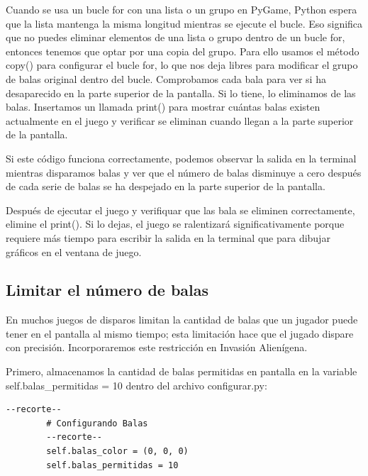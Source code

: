 Cuando se usa un bucle {\ttfamily for} con una lista o un grupo en PyGame, Python espera que la lista mantenga 
la misma longitud mientras se ejecute el bucle. Eso significa que no puedes eliminar elementos de una lista o grupo dentro de un bucle  {\ttfamily for}, entonces tenemos que optar por una copia del grupo. Para ello usamos el método {\ttfamily copy()} para configurar
 el bucle  {\ttfamily for}, lo que nos deja libres para modificar el grupo de balas original dentro del bucle. 
Comprobamos cada bala para ver si ha desaparecido en la parte superior de la pantalla. 
Si lo tiene, lo eliminamos de las balas. 
Insertamos un llamada {\ttfamily print()} para mostrar cuántas balas existen actualmente en el juego y verificar
se eliminan cuando llegan a la parte superior de la pantalla.

Si este código funciona correctamente, podemos observar la salida en la terminal mientras disparamos
balas y ver que el número de balas disminuye a cero después de cada serie de balas se ha despejado en la parte superior de la pantalla. 

Después de ejecutar el juego y verifiquar que las bala se eliminen correctamente, elimine el {\ttfamily print()}.
Si lo dejas, el juego se ralentizará significativamente porque requiere más tiempo para escribir la salida en la terminal
que para dibujar gráficos en el ventana de juego.

\subsection{Limitar el número de balas}

En muchos juegos de disparos limitan la cantidad de balas que un jugador puede tener en el
pantalla al mismo tiempo; esta limitación hace que el jugado dispare con precisión. Incorporaremos este restricción   
en Invasión Alienígena.   

Primero, almacenamos la cantidad de balas permitidas en pantalla en la variable {\ttfamily self.balas\_permitidas = 10} dentro del archivo  {\ttfamily configurar.py}:

\hspace{-2.75cm}{\ttfamily \scriptsize configurar.py}  \vspace{-0.5cm}
\begin{lstlisting}	
--recorte--	
        # Configurando Balas
        --recorte--
        self.balas_color = (0, 0, 0)
        self.balas_permitidas = 10
\end{lstlisting}


